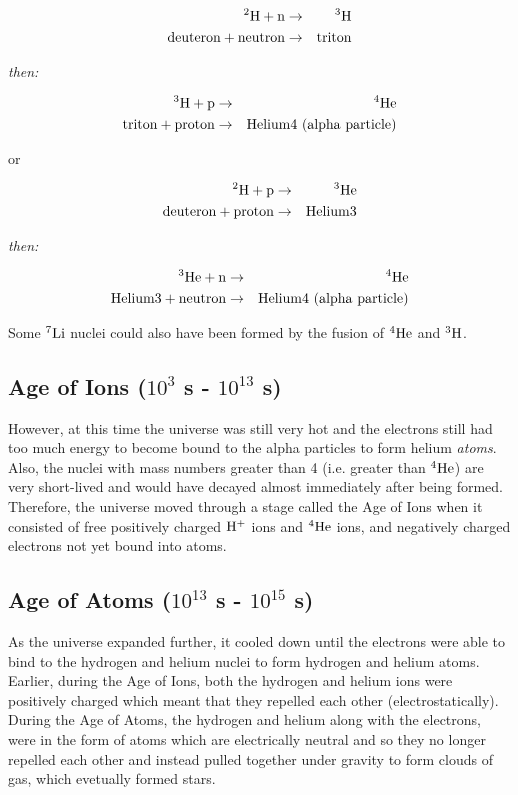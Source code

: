 \begin{eqnarray*}
^{2}\rm{H} + n & \rightarrow & ^{3}\rm{H} \\
\rm{deuteron} + \rm{neutron} & \rightarrow & \rm{triton}
\end{eqnarray*}

\centerline{\emph{then:}}

\begin{eqnarray*}
^{3}\rm{H} + p & \rightarrow & ^{4}\rm{He} \\
\rm{triton} + \rm{proton} & \rightarrow & \rm{Helium}\rm{4} \ \rm{(alpha} \ \rm{particle)}
\end{eqnarray*}

or

\begin{eqnarray*}
^{2}\rm{H} + p & \rightarrow & ^{3}\rm{He} \\
\rm{deuteron} + \rm{proton} & \rightarrow & \rm{Helium}\rm{3}
\end{eqnarray*}

\centerline{\emph{then:}}

\begin{eqnarray*}
^{3}\rm{He} + n & \rightarrow & ^{4}\rm{He} \\
\rm{Helium3} + \rm{neutron} & \rightarrow & \rm{Helium}\rm{4} \ \rm{(alpha} \ \rm{particle)}
\end{eqnarray*}

Some $^{7}\rm{Li}$ nuclei could also have been formed by the fusion of $^{4}\rm{He}$ and $^{3}\rm{H}$.

\subsection{Age of Ions ($10^{3}$ s - $10^{13}$ s)}
However, at this time the universe was still very hot and the electrons still had too much energy to become bound to the alpha particles to form helium \emph{atoms}. Also, the nuclei with mass numbers greater than 4 (i.e. greater than $^{4}\rm{He}$) are very short-lived and would have decayed almost immediately after being formed. Therefore, the universe moved through a stage called the Age of Ions when it consisted of free positively charged $\rm{H}^{+}$ ions and $^{4}\rm{He}$ ions, and negatively charged electrons not yet bound into atoms.

\subsection{Age of Atoms ($10^{13}$ s - $10^{15}$ s)}
As the universe expanded further, it cooled down until the electrons were able to bind to the hydrogen and helium nuclei to form hydrogen and helium atoms. Earlier, during the Age of Ions, both the hydrogen and helium ions were positively charged which meant that they repelled each other (electrostatically). During the Age of Atoms, the hydrogen and helium along with the electrons, were in the form of atoms which are electrically neutral and so they no longer repelled each other and instead pulled together under gravity to form clouds of gas, which evetually formed stars.

